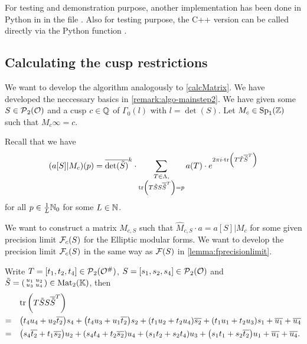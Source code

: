 For testing and demonstration purpose, another implementation has been done in Python in  in the file . Also for testing purpose, the C++ version can be called directly via the Python function .

\subsection{Calculating the cusp restrictions}
\label{calcMatrixTrans}
We want to develop the algorithm analogously to \cref{calcMatrix}. We have developed the neccessary basics in \cref{remark:algo-mainstep2}. We have given some $S \in \operatorname{\mathcal{P}}_2(\mathcal{O})$ and a cusp $c \in \mathbb{Q}$ of $\Gamma_0(l)$ with $l = \det(S)$. Let $M_c \in \operatorname{Sp}_1(\mathbb{Z})$ such that $M_c \infty = c$.

Recall that we have
\[ (a[S]| M_c) (p) = \overline{\det(\tilde{S})}^k \cdot \sum_{\begin{subarray}{c}
T \in \Lambda,\\
\textup{\textrm{tr}}\left(T \tilde{S} S \overline{\tilde{S}}^T\right) = p
\end{subarray}} a(T) \cdot e^{2 \pi i \cdot \textup{\textrm{tr}}\left(T \tilde{T} \overline{\tilde{S}}^T\right)} \]
for all $p \in \frac{1}{L} \mathbb{N}_0$ for some $L \in \mathbb{N}$.

We want to construct a matrix $\hat{M}_{c,S}$ such that $\hat{M}_{c,S} \cdot a = a[S]|M_c$ for some given precision limit $\mathcal{F}_c(S)$ for the Elliptic modular forms. We want to develop the precision limit $\mathcal{F}_c(S)$ in the same way as $\mathcal{F}(S)$ in \cref{lemma:fprecisionlimit}.

Write $T = [t_1,t_2,t_4] \in \operatorname{\mathcal{P}}_2(\mathcal{O}^\#)$, $S = [s_1,s_2,s_4] \in \operatorname{\mathcal{P}}_2(\mathcal{O})$ and $\tilde{S} = \left( \begin{smallmatrix} u_1 & u_2 \\ u_3 & u_4 \end{smallmatrix} \right) \in \operatorname{Mat}_2(\mathbb{K})$, then
\begin{align*}
& \textup{\textrm{tr}}\left(T \tilde{S} S \overline{\tilde{S}}^T\right) \\
=\quad & {\left(t_{4} u_{4} + u_{2} \overline{t_{2}}\right)} s_{4} + {\left(t_{4} u_{3} + u_{1} \overline{t_{2}}\right)} s_{2} + {\left(t_{1} u_{2} + t_{2} u_{4}\right)} \overline{s_{2}} + {\left(t_{1} u_{1} + t_{2} u_{3}\right)} s_{1} + \overline{u_{1}} + \overline{u_{4}} \\
=\quad & {\left(s_{4} \overline{t_{2}} + t_{1} \overline{s_{2}}\right)} u_{2} + {\left(s_{4} t_{4} + t_{2} \overline{s_{2}}\right)} u_{4} + {\left(s_{1} t_{2} + s_{2} t_{4}\right)} u_{3} + {\left(s_{1} t_{1} + s_{2} \overline{t_{2}}\right)} u_{1} + \overline{u_{1}} + \overline{u_{4}} .
\end{align*}


